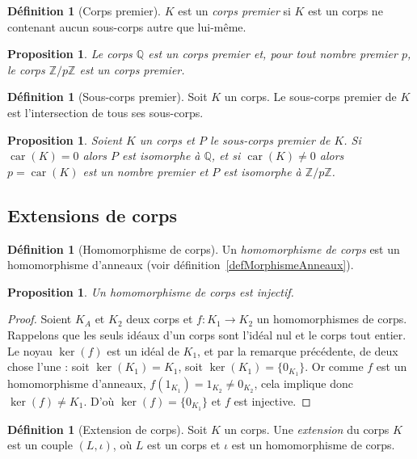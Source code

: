 \documentclass[a4paper, titlepage]{article}
\newtheorem{prop}[theo]{Proposition}
\theoremstyle{definition}
\newtheorem{defi}[theo]{Définition}
\theoremstyle{remark}
\def\Z{\mathbb Z}
\def\Q{\mathbb Q}
\def\car{\operatorname{car}}
\begin{document}
\begin{defi}[Corps premier]
$K$ est un \textit{corps premier} si $K$ est un corps ne contenant aucun sous-corps autre que lui-même.
\end{defi}

\begin{prop}
Le corps $\Q$ est un corps premier et, pour tout nombre premier $p$, le corps $\Z/p\Z$ est un corps premier.
\end{prop}

\begin{defi}[Sous-corps premier]
Soit $K$ un corps. Le sous-corps premier de $K$ est l'intersection de tous ses sous-corps.
\end{defi}

\begin{prop}
Soient $K$ un corps et $P$ le sous-corps premier de $K$. Si $\car(K) = 0$ alors $P$ est isomorphe à $\Q$, et si $\car(K) \neq 0$ alors $p = \car(K)$ est un nombre premier et $P$ est isomorphe à $\Z/p\Z$.
\end{prop}

\subsection{Extensions de corps}

\begin{defi}[Homomorphisme de corps]
Un \textit{homomorphisme de corps} est un homomorphisme d'anneaux (voir définition~\ref{defMorphismeAnneaux}).
\end{defi}

\begin{prop}
Un homomorphisme de corps est injectif.
\end{prop}

\begin{proof}
Soient $K_A$ et $K_2$ deux corps et $f : K_1 \rightarrow K_2$ un homomorphismes de corps. Rappelons que les seuls idéaux d'un corps sont l'idéal nul et le corps tout entier. Le noyau $\ker(f)$ est un idéal de $K_1$, et par la remarque précédente, de deux chose l'une : soit $\ker(K_1) = K_1$, soit $\ker(K_1)=\{0_{K_1}\}$. Or comme $f$ est un homomorphisme d'anneaux, $f(1_{K_1}) = 1_{K_2} \neq 0_{K_2}$, cela implique donc $\ker(f) \neq K_1$. D'où $\ker(f) = \{0_{K_1}\}$ et $f$ est injective.
\end{proof}

\begin{defi}[Extension de corps]
Soit $K$ un corps. Une \textit{extension} du corps $K$ est un couple $(L, \iota)$, où $L$ est un corps et $\iota$ est un homomorphisme de corps.
\end{defi}
\end{document}
